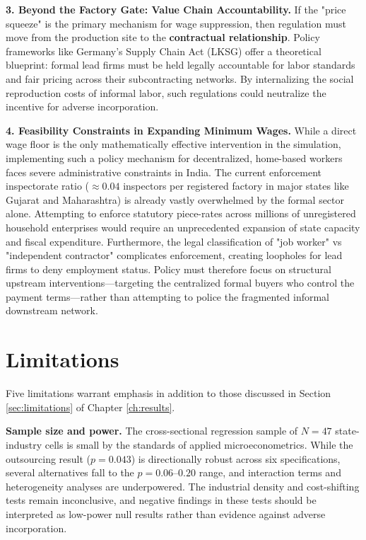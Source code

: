 \textbf{3. Beyond the Factory Gate: Value Chain Accountability.} If the "price squeeze" is the primary mechanism for wage suppression, then regulation must move from the production site to the \textbf{contractual relationship}. Policy frameworks like Germany's Supply Chain Act (LKSG) offer a theoretical blueprint: formal lead firms must be held legally accountable for labor standards and fair pricing across their subcontracting networks. By internalizing the social reproduction costs of informal labor, such regulations could neutralize the incentive for adverse incorporation.

\textbf{4. Feasibility Constraints in Expanding Minimum Wages.} While a direct wage floor is the only mathematically effective intervention in the simulation, implementing such a policy mechanism for decentralized, home-based workers faces severe administrative constraints in India. The current enforcement inspectorate ratio ($\approx 0.04$ inspectors per registered factory in major states like Gujarat and Maharashtra) is already vastly overwhelmed by the formal sector alone. Attempting to enforce statutory piece-rates across millions of unregistered household enterprises would require an unprecedented expansion of state capacity and fiscal expenditure. Furthermore, the legal classification of "job worker" vs "independent contractor" complicates enforcement, creating loopholes for lead firms to deny employment status. Policy must therefore focus on structural upstream interventions—targeting the centralized formal buyers who control the payment terms—rather than attempting to police the fragmented informal downstream network.

\section{Limitations}
\label{sec:limitations_discussion}

Five limitations warrant emphasis in addition to those discussed in Section \ref{sec:limitations} of Chapter \ref{ch:results}.

\textbf{Sample size and power.} The cross-sectional regression sample of $N = 47$ state-industry cells is small by the standards of applied microeconometrics. While the outsourcing result ($p = 0.043$) is directionally robust across six specifications, several alternatives fall to the $p = 0.06$--$0.20$ range, and interaction terms and heterogeneity analyses are underpowered. The industrial density and cost-shifting tests remain inconclusive, and negative findings in these tests should be interpreted as low-power null results rather than evidence against adverse incorporation.


